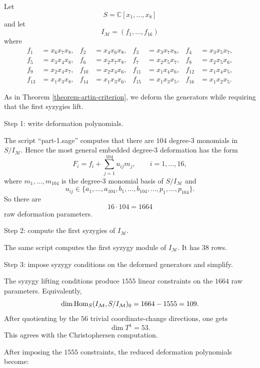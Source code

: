 \noindent
Let
$$
S=\mathbb{C}[x_1,\ldots,x_8]
$$
and let
$$
I_{\mathcal{M}}=(f_1,\ldots,f_{16})
$$
where
$$
\begin{aligned}
f_1&=x_6x_7x_8, & f_2&=x_4x_6x_8, & f_3&=x_3x_7x_8, & f_4&=x_3x_5x_7,\\
f_5&=x_3x_4x_8, & f_6&=x_2x_7x_8, & f_7&=x_2x_5x_7, & f_8&=x_2x_5x_6,\\
f_9&=x_2x_4x_7, &
f_{10}&=x_2x_4x_6, &
f_{11}&=x_1x_4x_6, &
f_{12}&=x_1x_4x_5,\\
f_{13}&=x_1x_3x_8, & f_{14}&=x_1x_3x_6, & f_{15}&=x_1x_3x_5, & f_{16}&=x_1x_2x_5.
\end{aligned}
$$

\medskip\noindent
As in Theorem \ref{theorem-artin-criterion}, we deform the generators
while requiring that the first syzygies lift.

\medskip\noindent
Step 1: write deformation polynomials.

\medskip\noindent
The script
``part-1.sage'' computes that there are
$104$ degree-$3$ monomials in $S/I_{\mathcal{M}}$.
Hence the most general embedded degree-$3$
deformation has the form
$$
F_i=f_i+\sum_{j=1}^{104}u_{ij}m_j,\qquad i=1,\ldots,16,
$$
where $m_1,\ldots,m_{104}$ is the degree-$3$
monomial basis of $S/I_{\mathcal{M}}$ and
$$
u_{ij}\in
\{a_1,\ldots,a_{104},
b_1,\ldots,b_{104},
\ldots,
p_1,\ldots,p_{104}\}.
$$
So there are
$$
16\cdot 104=1664
$$
raw deformation parameters.

\medskip\noindent
Step 2: compute the first syzygies of $I_{\mathcal{M}}$.

\medskip\noindent
The same script computes the first syzygy module
of $I_{\mathcal{M}}$.
It has $38$ rows.

\medskip\noindent
Step 3: impose syzygy conditions on the deformed generators and simplify.

\medskip\noindent
The syzygy lifting conditions produce $1555$
linear constraints on the $1664$ raw parameters.
Equivalently,
$$
\dim \mathop{\mathrm{Hom}}\nolimits_S(
I_{\mathcal{M}},S/I_{\mathcal{M}})_0
=1664-1555
=109.
$$
After quotienting by the $56$ trivial
coordinate-change directions, one gets
$$
\dim T^1=53.
$$
This agrees with the Christophersen computation.

\medskip\noindent
After imposing the $1555$ constraints, the reduced
deformation polynomials become:

